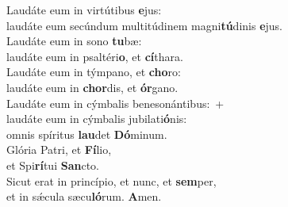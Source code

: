 \evenverse Laudáte eum in virtútibus \textbf{e}jus:~\*\\
\evenverse laudáte eum secúndum multitúdinem magni\textbf{tú}dinis \textbf{e}jus.\\
\oddverse Laudáte eum in sono \textbf{tu}bæ:~\*\\
\oddverse laudáte eum in psaltéri\textbf{o}, et \textbf{cí}thara.\\
\evenverse Laudáte eum in týmpano, et \textbf{cho}ro:~\*\\
\evenverse laudáte eum in \textbf{chor}dis, et \textbf{ór}gano.\\
\oddverse Laudáte eum in cýmbalis benesonántibus:~+\\
\oddverse  laudáte eum in cýmbalis jubilati\textbf{ó}nis:~\*\\
\oddverse omnis spíritus \textbf{lau}det \textbf{Dó}minum.\\
\evenverse Glória Patri, et \textbf{Fí}lio,~\*\\
\evenverse et Spi\textbf{rí}tui \textbf{San}cto.\\
\oddverse Sicut erat in princípio, et nunc, et \textbf{sem}per,~\*\\
\oddverse et in sǽcula sæcu\textbf{ló}rum. \textbf{A}men.\\
